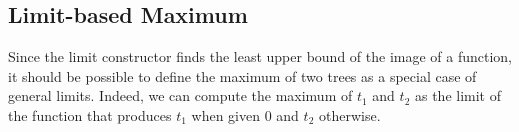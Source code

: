 

\subsection{Limit-based Maximum}

Since the limit constructor finds the least upper bound
of the image of a function, it should be possible to define
the maximum of two trees as a special case of general limits.
Indeed, we can compute the maximum of $t_1$ and $t_2$ as the limit
of the function that produces $t_1$ when given $0$ and $t_2$ otherwise.

\begin{code}[hide]%
%
\>[2]\AgdaSpace{}%
\AgdaSpace{}%
\AgdaSpace{}%
\AgdaSpace{}%
\AgdaSymbol{(}\AgdaSpace{}%
\AgdaSymbol{;}\AgdaSpace{}%
\AgdaOperator{\AgdaFunction{\AgdaUnderscore{}<\AgdaUnderscore{}}}\AgdaSymbol{)}\<%
\\
%
\>[2]\AgdaSpace{}%
\AgdaSpace{}%
\<%
\\
%
\>[2]\AgdaSpace{}%
\AgdaSpace{}%
\<%
\\
%
\>[2]\AgdaSpace{}%
\AgdaSpace{}%
\<%
\\
%
\>[2]\AgdaSpace{}%
\AgdaSpace{}%
\<%
\\
%
\>[2]\AgdaSpace{}%
\AgdaSpace{}%
\AgdaSymbol{\{}\AgdaSymbol{\}}\<%
\\
\>[2][@{}l@{\AgdaIndent{0}}]%
\>[4]\AgdaSymbol{(}\AgdaSpace{}%
\AgdaSymbol{:}\AgdaSpace{}%
\AgdaSpace{}%
\AgdaSymbol{)}\<%
\\
%
\>[4]\AgdaSymbol{(}\AgdaSpace{}%
\AgdaSymbol{:}\AgdaSpace{}%
\AgdaSpace{}%
\AgdaSpace{}%
\AgdaSpace{}%
\AgdaSymbol{)}\<%
\\
%
\>[4]\AgdaSymbol{(}\AgdaSpace{}%
\AgdaSymbol{:}\AgdaSpace{}%
\AgdaSymbol{)}\AgdaSpace{}%
\AgdaSymbol{(}\AgdaSpace{}%
\AgdaSymbol{:}\AgdaSpace{}%
\AgdaSpace{}%
\AgdaSymbol{(}\AgdaSpace{}%
\AgdaSymbol{)}\AgdaSpace{}%
\AgdaSpace{}%
\AgdaSymbol{)}\AgdaSpace{}%
\<%
\\
%
\>[4]\AgdaSpace{}%
\AgdaSpace{}%
\AgdaSpace{}%
\AgdaSpace{}%
\AgdaSpace{}%
\AgdaSpace{}%
\<%
\end{code}

